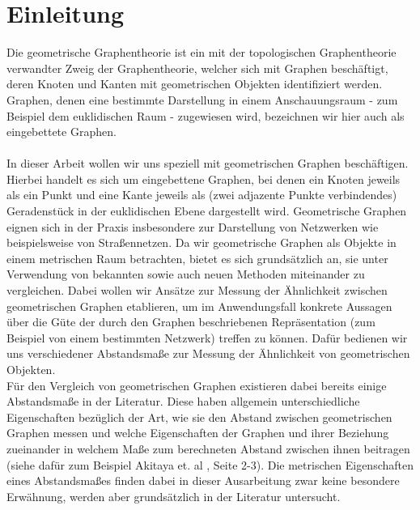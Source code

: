 \documentclass[a4paper, 12pt, twoside]{article}
\theoremstyle{Format1} %
\begin{document}
\newpage
\tableofcontents
\newpage\null\thispagestyle{empty}\newpage %
\section{Einleitung}

Die geometrische Graphentheorie ist ein mit der topologischen Graphentheorie verwandter Zweig der Graphentheorie, welcher sich mit Graphen beschäftigt, deren Knoten und Kanten
mit geometrischen Objekten identifiziert werden.
Graphen, denen eine bestimmte Darstellung in einem Anschauungsraum - zum Beispiel dem euklidischen Raum - zugewiesen wird, bezeichnen wir hier auch als eingebettete Graphen.
\\
\\
In dieser Arbeit wollen wir uns speziell mit geometrischen Graphen beschäftigen. Hierbei handelt es sich um eingebettene Graphen,
bei denen ein Knoten jeweils als ein Punkt und eine Kante jeweils als (zwei adjazente Punkte verbindendes) Geradenstück in der euklidischen Ebene dargestellt wird.
Geometrische Graphen eignen sich in der Praxis insbesondere zur Darstellung von Netzwerken wie beispielsweise von Straßennetzen.
Da wir geometrische Graphen als Objekte in einem metrischen Raum betrachten, bietet es sich grundsätzlich an, sie unter Verwendung von bekannten sowie auch neuen Methoden miteinander zu vergleichen.
Dabei wollen wir Ansätze zur Messung der Ähnlichkeit zwischen geometrischen Graphen etablieren, um im Anwendungsfall konkrete Aussagen über die Güte der durch den Graphen
beschriebenen Repräsentation (zum Beispiel von einem bestimmten Netzwerk) treffen zu können. Dafür bedienen wir uns verschiedener Abstandsmaße zur Messung der Ähnlichkeit von geometrischen Objekten.
\\
Für den Vergleich von geometrischen Graphen existieren dabei bereits einige Abstandsmaße in der Literatur.
Diese haben allgemein unterschiedliche Eigenschaften bezüglich der Art, wie sie den Abstand zwischen geometrischen Graphen messen und welche Eigenschaften der Graphen und ihrer Beziehung
zueinander in welchem Maße zum berechneten Abstand zwischen ihnen beitragen (siehe dafür zum Beispiel Akitaya et. al \cite{Akitaya}, Seite 2-3).
Die metrischen Eigenschaften eines Abstandsmaßes finden dabei in dieser Ausarbeitung zwar keine besondere Erwähnung, werden aber grundsätzlich in der Literatur untersucht.
\\
\\
\end{document}
